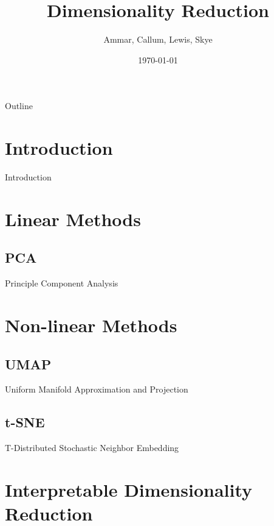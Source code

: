 \documentclass{beamer}
\title{Dimensionality Reduction}
\author{Ammar, Callum, Lewis, Skye}
\date{\today}
\begin{document}
\begin{frame}
    \titlepage 
\end{frame}

\logo{}


\begin{frame}{Outline}
    \tableofcontents
\end{frame}


\section{Introduction}
\begin{frame}{Introduction}

\end{frame}

\section{Linear Methods}
\subsection{PCA}
\begin{frame}{Principle Component Analysis}
\end{frame}

\section{Non-linear Methods}
\subsection{UMAP}
\begin{frame}{Uniform Manifold Approximation and Projection}
    
\end{frame}

\subsection{t-SNE}
\begin{frame}{T-Distributed Stochastic Neighbor Embedding}
    
\end{frame}

\section{Interpretable Dimensionality Reduction}
\end{document}
